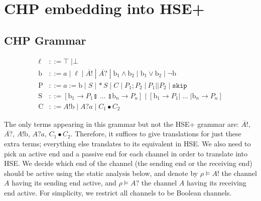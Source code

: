 \documentclass[times, 10pt]{article}
\begin{document}
\section{CHP embedding into HSE+}

\begin{comment}
\subsection{HSE+ Grammar}
\begin{align*}
    \ell & ::= \top \; | \bot \\
    \mathrm{b} & ::= a \; | \; \ell \; | \; \mathrm{b}_1 \wedge \mathrm{b}_2 \; | \; \mathrm{b}_1 \vee \mathrm{b}_2 \; | \; \lnot \mathrm{b} \\
    \mathrm{P} & ::= a := \mathrm{b} \; | \; S \; | \, *S \; | \; P_1; P_2 \; | \: P_1 || P_2 \; | \; \mathtt{skip} \\
    \mathrm{S} & ::= [ \mathrm{b}_1 \rightarrow P_1 \talloblong \; \ldots \; \talloblong \mathrm{b}_n \rightarrow P_n ] \; | \; [ \mathrm{b}_1 \rightarrow P_1 | \; \ldots \; | \mathrm{b}_n \rightarrow P_n ] \\
\end{align*}

\end{comment}


\subsection{CHP Grammar}
\begin{align*}
    \ell & ::= \top \; | \bot \\
    \mathrm{b} & ::= a \; | \; \ell \; | \; \overline{A!} \; | \; \overline{A?} \; | \; \mathrm{b}_1 \wedge \mathrm{b}_2 \; | \; \mathrm{b}_1 \vee \mathrm{b}_2 \; | \; \lnot \mathrm{b} \\
    \mathrm{P} & ::= a := \mathrm{b} \; | \; S \; | \, *S \; | \; C \; | \; P_1; P_2 \; | \: P_1 || P_2 \; | \; \mathtt{skip} \\
    \mathrm{S} & ::= [ \mathrm{b}_1 \rightarrow P_1 \talloblong \; \ldots \; \talloblong \mathrm{b}_n \rightarrow P_n ] \; | \; [ \mathrm{b}_1 \rightarrow P_1 | \; \ldots \; | \mathrm{b}_n \rightarrow P_n ] \\
    \mathrm{C} & ::= A!\mathrm{b} \; | \; A?a \; | \; C_1 \bullet C_2
\end{align*}

The only terms appearing in this grammar but not the HSE+ grammar are:
$\overline{A!}$, $\overline{A?}$, $A!\mathrm{b}$, $A?a$, $C_1 \bullet C_2$.
Therefore, it suffices to give translations for just these extra terms;
everything else translates to its equivalent in HSE. We also need to pick an
active end and a passive end for each channel in order to translate into HSE.
We decide which end of the channel (the sending end or the receiving end) should
be active using the static analysis below, and denote by $\rho \vDash A!$ the
channel $A$ having its sending end active, and $\rho \vDash A?$ the channel $A$
having its receiving end active.  For simplicity, we restrict all channels to be
Boolean channels.
\end{document}
